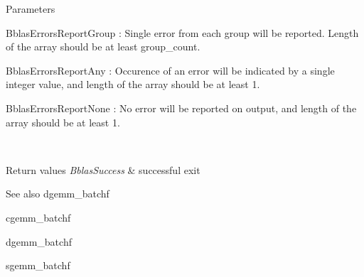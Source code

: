 \begin{DoxyParams}[1]{Parameters}
\begin{DoxyItemize}
\item Bblas\+Errors\+Report\+Group \+: Single error from each group will be reported. Length of the array should be at least group\+\_\+count.
\item Bblas\+Errors\+Report\+Any \+: Occurence of an error will be indicated by a single integer value, and length of the array should be at least 1.
\item Bblas\+Errors\+Report\+None \+: No error will be reported on output, and length of the array should be at least 1.
\end{DoxyItemize}\\
\hline
\end{DoxyParams}

\begin{DoxyRetVals}{Return values}
{\em Bblas\+Success} & successful exit\\
\hline
\end{DoxyRetVals}
\begin{DoxySeeAlso}{See also}
dgemm\+\_\+batchf 

cgemm\+\_\+batchf 

dgemm\+\_\+batchf 

sgemm\+\_\+batchf 
\end{DoxySeeAlso}
